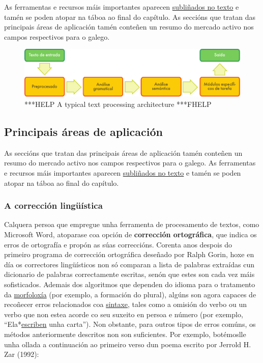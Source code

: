 \begin{multicols}{2}
As ferramentas e recursos máis importantes aparecen \uline{subliñados no texto} e tamén se poden atopar na táboa ao final do capítulo. As seccións que tratan das principais áreas de aplicación tamén conteñen un resumo do mercado activo nos campos respectivos para o galego. 

\begin{figure}[b]
  \center
  \vspace{-5mm} \includegraphics[width=\textwidth]{../_media/galician/text_processing_app_architecture}
  \caption{***HELP A typical text processing architecture ***FHELP}
  \label{fig:textprocessingarch_ga}
\end{figure}


\subsection{Principais áreas de aplicación} 

 As seccións que tratan das principais áreas de aplicación tamén conteñen un resumo do mercado activo nos campos respectivos para o galego. As ferramentas e recursos máis importantes aparecen \underline{subliñados no texto} e tamén se poden atopar na táboa ao final do capítulo.

\subsubsection{A corrección lingüística}

   Calquera persoa que empregue unha ferramenta de procesamento de textos, como Microsoft Word, atoparase coa opción de \textbf{corrección ortográfica}, que indica os erros de ortografía e propón as súas correccións. Corenta anos despois do primeiro programa de corrección ortográfica deseñado por Ralph Gorin, hoxe en día os correctores lingüísticos non só comparan a lista de palabras extraídas cun dicionario de palabras correctamente escritas, senón que estes son cada vez máis sofisticados. Ademais dos algoritmos que dependen do idioma para o tratamento da \uline{morfoloxía} (por exemplo, a formación do plural), algúns son agora capaces de recoñecer erros relacionados coa \uline{sintaxe}, tales como a omisión do verbo ou un verbo que non estea acorde co seu suxeito en persoa e número (por exemplo, “Ela*\uline{escriben} unha carta”). Non obstante, para outros tipos de erros comúns, os métodos anteriormente descritos non son suficientes. Por exemplo, botémoslle unha ollada a continuación ao primeiro verso dun poema escrito por Jerrold H. Zar (1992): 


\end{multicols}
